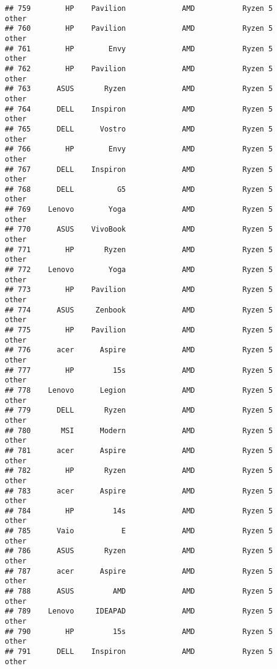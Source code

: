\documentclass[
]{article}
\begin{document}
\begin{verbatim}
## 759        HP    Pavilion             AMD           Ryzen 5           other
## 760        HP    Pavilion             AMD           Ryzen 5           other
## 761        HP        Envy             AMD           Ryzen 5           other
## 762        HP    Pavilion             AMD           Ryzen 5           other
## 763      ASUS       Ryzen             AMD           Ryzen 5           other
## 764      DELL    Inspiron             AMD           Ryzen 5           other
## 765      DELL      Vostro             AMD           Ryzen 5           other
## 766        HP        Envy             AMD           Ryzen 5           other
## 767      DELL    Inspiron             AMD           Ryzen 5           other
## 768      DELL          G5             AMD           Ryzen 5           other
## 769    Lenovo        Yoga             AMD           Ryzen 5           other
## 770      ASUS    VivoBook             AMD           Ryzen 5           other
## 771        HP       Ryzen             AMD           Ryzen 5           other
## 772    Lenovo        Yoga             AMD           Ryzen 5           other
## 773        HP    Pavilion             AMD           Ryzen 5           other
## 774      ASUS     Zenbook             AMD           Ryzen 5           other
## 775        HP    Pavilion             AMD           Ryzen 5           other
## 776      acer      Aspire             AMD           Ryzen 5           other
## 777        HP         15s             AMD           Ryzen 5           other
## 778    Lenovo      Legion             AMD           Ryzen 5           other
## 779      DELL       Ryzen             AMD           Ryzen 5           other
## 780       MSI      Modern             AMD           Ryzen 5           other
## 781      acer      Aspire             AMD           Ryzen 5           other
## 782        HP       Ryzen             AMD           Ryzen 5           other
## 783      acer      Aspire             AMD           Ryzen 5           other
## 784        HP         14s             AMD           Ryzen 5           other
## 785      Vaio           E             AMD           Ryzen 5           other
## 786      ASUS       Ryzen             AMD           Ryzen 5           other
## 787      acer      Aspire             AMD           Ryzen 5           other
## 788      ASUS         AMD             AMD           Ryzen 5           other
## 789    Lenovo     IDEAPAD             AMD           Ryzen 5           other
## 790        HP         15s             AMD           Ryzen 5           other
## 791      DELL    Inspiron             AMD           Ryzen 5           other

\end{verbatim}
\end{document}
